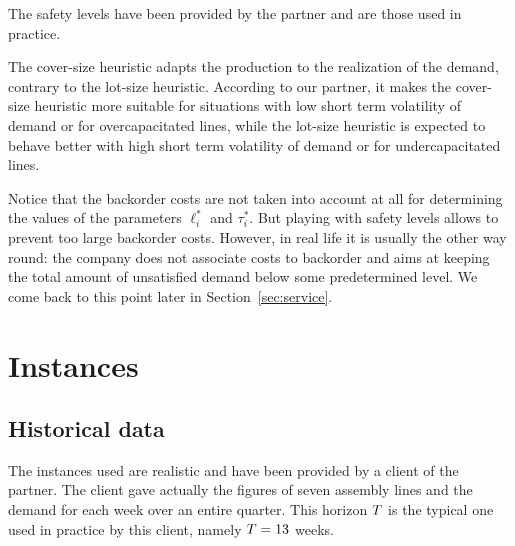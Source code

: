 The safety levels have been provided by the partner and are those used in practice.


The cover-size heuristic adapts the production to the realization of the demand, contrary to the lot-size heuristic. According to our partner, it makes the cover-size heuristic more suitable for situations with low short term volatility of demand or for overcapacitated lines, while the lot-size heuristic is expected to behave better with high short term volatility of demand or for undercapacitated lines.

Notice that the backorder costs are not taken into account at all for determining the values of the parameters $\ell_i^*$ and $\tau_i^*$.
But playing with safety levels allows to prevent too large backorder costs. However, in real life it is usually the other way round: the company does not associate costs to backorder and aims at keeping the total amount of unsatisfied demand below some predetermined level. We come back to this point later in Section~\ref{sec:service}.




\section{Instances}

\subsection{Historical data}
\label{sec:PDP:numerical-experiments:historical-data}

The instances used are realistic and have been provided by a client of the partner. The client gave actually the figures of seven assembly lines and the demand for each week over an entire quarter.
This horizon $T$ is the typical one used in practice by this client, namely $T=13$ weeks.

